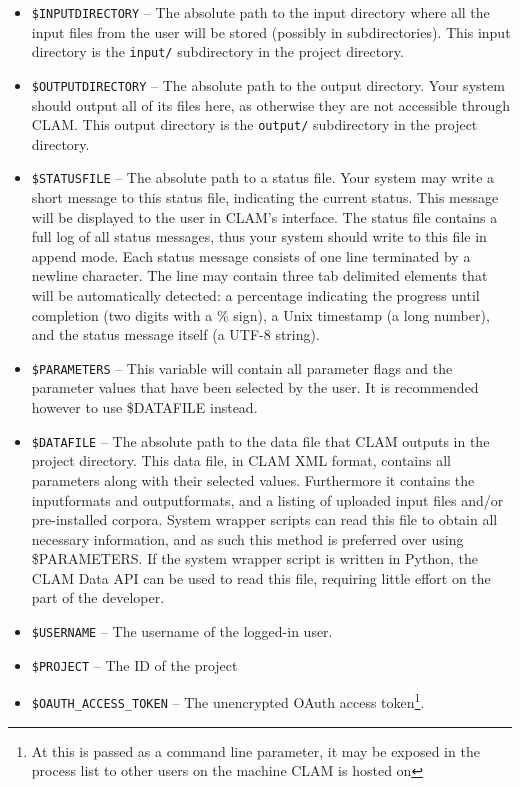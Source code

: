 \documentclass[a4paper,12pt]{report}
\begin{document}
\begin{itemize}
\item \texttt{\$INPUTDIRECTORY} -- The absolute path to the input directory where all the input files from the user will be stored (possibly in subdirectories). This input directory is the \texttt{input/} subdirectory in the project directory.
\item \texttt{\$OUTPUTDIRECTORY} -- The absolute path to the output directory. Your system should output all of its files here, as otherwise they are not accessible through CLAM.  This output directory is the \texttt{output/} subdirectory in the project directory.
\item \texttt{\$STATUSFILE} -- The absolute path to a status file. Your system may write a short message to this status file, indicating the current status. This message will be displayed to the user in CLAM's interface. The status file contains a full log of all status messages, thus your system should write to this file in append mode. Each status message consists of one line terminated by a newline character. The line may contain three tab delimited elements that will be automatically detected: a percentage indicating the progress until completion (two digits with a \% sign), a Unix timestamp (a long number), and the status message itself (a UTF-8 string).
\item \texttt{\$PARAMETERS} -- This variable will contain all parameter flags and the parameter values that have been selected by the user. It is recommended however to use \$DATAFILE instead.  
\item \texttt{\$DATAFILE} -- The absolute path to the data file that CLAM outputs in the project directory. This data file, in CLAM XML format, contains all parameters along with their selected values. Furthermore it contains the inputformats and outputformats, and a listing of uploaded input files and/or pre-installed corpora. System wrapper scripts can read this file to obtain all necessary information, and as such this method is preferred over using \$PARAMETERS. If the system wrapper script is written in Python, the CLAM Data API can be used to read this file, requiring little effort on the part of the developer. 
\item \texttt{\$USERNAME} -- The username of the logged-in user.
\item \texttt{\$PROJECT} -- The ID of the project
\item \texttt{\$OAUTH\_ACCESS\_TOKEN} -- The unencrypted OAuth access token\footnote{At this is passed as a command line parameter, it may be exposed in the process list to other users on the machine CLAM is hosted on}.
\end{itemize}
\end{document}
